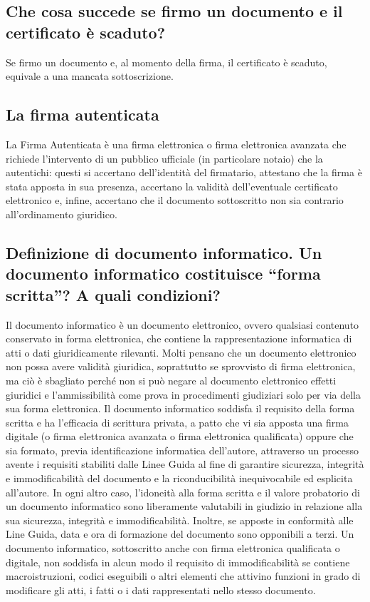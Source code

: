 \subsection{Che cosa succede se firmo un documento e il certificato è scaduto?}
Se firmo un documento e, al momento della firma, il certificato è scaduto, equivale a una mancata sottoscrizione.

\subsection{La firma autenticata}
La Firma Autenticata è una firma elettronica o firma elettronica avanzata che richiede
l'intervento di un pubblico ufficiale (in particolare notaio) che la autentichi:
questi si accertano dell'identità del firmatario, attestano che la firma è stata apposta in sua presenza,
accertano la validità dell'eventuale certificato elettronico e, infine, accertano che il documento sottoscritto
non sia contrario all'ordinamento giuridico.

\subsection{Definizione di documento informatico. Un documento informatico costituisce “forma scritta”? A quali condizioni?}
Il documento informatico è un documento elettronico, ovvero qualsiasi
contenuto conservato in forma elettronica, che contiene la rappresentazione informatica
di atti o dati giuridicamente rilevanti. Molti pensano che un documento elettronico
non possa avere validità giuridica, soprattutto se sprovvisto di firma elettronica,
ma ciò è sbagliato perché non si può negare al documento elettronico effetti giuridici
e l'ammissibilità come prova in procedimenti giudiziari solo per via della sua forma elettronica.
Il documento informatico soddisfa il requisito della forma scritta e ha l'efficacia di scrittura privata,
a patto che vi sia apposta una firma digitale (o firma elettronica avanzata o firma elettronica qualificata)
oppure che sia formato, previa identificazione informatica dell'autore, attraverso
un processo avente i requisiti stabiliti dalle Linee Guida al fine di garantire sicurezza,
integrità e immodificabilità del documento e la riconducibilità inequivocabile ed esplicita all'autore.
\newline In ogni altro caso, l'idoneità alla forma scritta e il valore probatorio di un documento informatico
sono liberamente valutabili in giudizio in relazione alla sua sicurezza, integrità e immodificabilità.
Inoltre, se apposte in conformità alle Line Guida, data e ora di formazione del documento sono opponibili a terzi.
Un documento informatico, sottoscritto anche con firma elettronica qualificata o digitale, non soddisfa
in alcun modo il requisito di immodificabilità se contiene macroistruzioni, codici eseguibili o altri
elementi che attivino funzioni in grado di modificare gli atti, i fatti o i dati rappresentati nello stesso documento.

